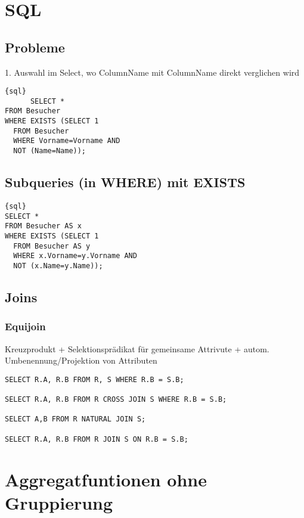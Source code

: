 \documentclass{article}
\begin{document}
\section{SQL}

\subsection{Probleme}
1. Auswahl im Select, wo ColumnName mit ColumnName direkt verglichen wird

\begin{verbatim}{sql}
      SELECT *
FROM Besucher
WHERE EXISTS (SELECT 1
  FROM Besucher
  WHERE Vorname=Vorname AND
  NOT (Name=Name));

  \end{verbatim}





\subsection{Subqueries (in WHERE) mit EXISTS}


\begin{verbatim}{sql}
SELECT *
FROM Besucher AS x
WHERE EXISTS (SELECT 1
  FROM Besucher AS y
  WHERE x.Vorname=y.Vorname AND
  NOT (x.Name=y.Name));
\end{verbatim}


\subsection{Joins}
\subsubsection{Equijoin}
\color{red}Kreuzprodukt + Selektionsprädikat für gemeinsame Attrivute + autom. Umbenennung/Projektion von Attributen\color{black}


\begin{verbatim}
SELECT R.A, R.B FROM R, S WHERE R.B = S.B;  

SELECT R.A, R.B FROM R CROSS JOIN S WHERE R.B = S.B;

SELECT A,B FROM R NATURAL JOIN S;

SELECT R.A, R.B FROM R JOIN S ON R.B = S.B;
\end{verbatim}


\section{Aggregatfuntionen ohne Gruppierung}
\end{document}

